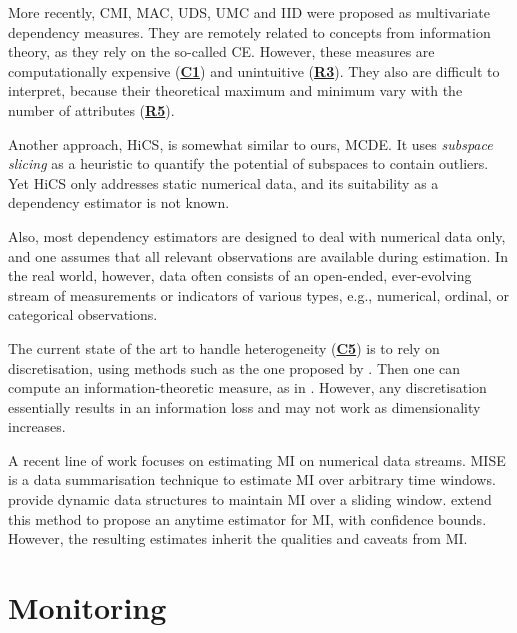 More recently, \gls{CMI},  \gls{MAC}, \gls{UDS},
\gls{UMC} and \gls{IID} were proposed as multivariate dependency measures. They are remotely related to concepts from information theory, as they rely on the so-called \gls{CE}. 
However, these measures are computationally expensive (\hyperlink{C1}{\textbf{C1}}) and unintuitive %
(\hyperlink{R3}{\textbf{R3}}). 
They also are difficult to interpret, because their theoretical maximum and minimum vary with the number of attributes (\hyperlink{R5}{\textbf{R5}}). 

Another approach, \gls{HiCS}, is somewhat similar to ours, \gls{MCDE}.
It uses \textit{subspace slicing} as a heuristic to quantify the potential of subspaces to contain outliers. Yet \gls{HiCS} only addresses static numerical data, and its suitability as a dependency estimator is not known. 

Also, most dependency estimators are designed to deal with numerical data only, and one assumes that all relevant observations are available during estimation. In the real world, however, data often consists of an open-ended, ever-evolving stream of measurements or indicators of various types, e.g., numerical, ordinal, or categorical observations.

The current state of the art to handle heterogeneity (\hyperlink{C5}{\textbf{C5}}) is to rely on discretisation, using methods such as the one proposed by \cite{DBLP:conf/ijcai/FayyadI93}. %
Then one can compute an information-theoretic measure, as in \cite{DBLP:conf/ssdbm/NguyenMAB14}. However, any discretisation essentially results in an information loss and may not work as dimensionality increases. %

A recent line of work focuses on estimating \gls{MI} on numerical data streams. \gls{MISE} is a data summarisation technique to estimate \gls{MI} over arbitrary time windows. 
\cite{DBLP:conf/edbt/VollmerRB18} provide dynamic data structures to maintain \gls{MI} over a sliding window. %
\cite{DBLP:conf/edbt/VollmerB19} extend this method to propose an anytime estimator for \gls{MI}, with confidence bounds. 
However, the resulting estimates inherit the qualities and caveats from \gls{MI}. 

\section{Monitoring}

